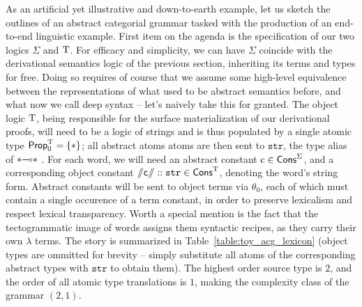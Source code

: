 As an artificial yet illustrative and down-to-earth example, let us sketch the outlines of an abstract categorial grammar tasked with the production of an end-to-end linguistic example.
First item on the agenda is the specification of our two logics $\Sigma$ and $\mathrm{T}$.
For efficacy and simplicity, we can have $\Sigma$ coincide with the derivational semantics logic of the previous section, inheriting its terms and types for free.
Doing so requires of course that we assume some high-level equivalence between the representations of what used to be abstract semantics before, and what now we call deep syntax -- let's naively take this for granted.
The object logic $\mathrm{T}$, being responsible for the surface materialization of our derivational proofs, will need to be a logic of strings and is thus populated by a single atomic type $\mathsf{Prop}_0^{\mathrm{T}} = \{ *\}$; all abstract atoms atoms are then sent to $\mathtt{str}$, the type alias of $* \li *$ .
For each word, we will need an abstract constant $\text{c} \in \mathsf{Cons}^{\Sigma}$, and a corresponding object constant $\mathsf{\sslash c\sslash} :: \mathtt{str} \in \mathsf{Cons}^{\mathrm{T}}$, denoting the word's string form. 
Abstract constants will be sent to object terms via $\theta_0$, each of which must contain a single occurence of a term constant, in order to preserve lexicalism and respect lexical transparency.
Worth a special mention is the fact that the tectogrammatic image of words assigns them syntactic recipes, as they carry their own $\lambda$ terms.
The story is summarized in Table~\ref{table:toy_acg_lexicon} (object types are ommitted for brevity -- simply substitute all atoms of the corresponding abstract types with $\mathtt{str}$ to obtain them).
The highest order source type is $2$, and the order of all atomic type translations is $1$, making the complexity class of the grammar $(2, 1)$.

